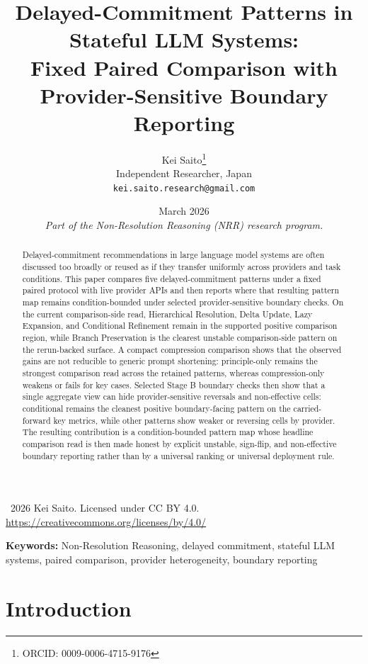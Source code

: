 \documentclass[11pt,a4paper]{article}
\title{\textbf{Delayed-Commitment Patterns in Stateful LLM Systems:\\Fixed Paired Comparison with Provider-Sensitive Boundary Reporting}}
\author{
  Kei Saito\thanks{ORCID: 0009-0006-4715-9176} \\
  Independent Researcher, Japan \\
  \texttt{kei.saito.research@gmail.com}
}
\date{March 2026 \\[0.5em]
\textit{Part of the Non-Resolution Reasoning (NRR) research program.}}
\begin{document}
\maketitle

\begin{center}
\textcopyright\ 2026 Kei Saito.
Licensed under CC BY 4.0.\\
\url{https://creativecommons.org/licenses/by/4.0/}
\end{center}

\begin{abstract}
Delayed-commitment recommendations in large language model systems are often discussed too broadly or reused as if they transfer uniformly across providers and task conditions. This paper compares five delayed-commitment patterns under a fixed paired protocol with live provider APIs and then reports where that resulting pattern map remains condition-bounded under selected provider-sensitive boundary checks. On the current comparison-side read, Hierarchical Resolution, Delta Update, Lazy Expansion, and Conditional Refinement remain in the supported positive comparison region, while Branch Preservation is the clearest unstable comparison-side pattern on the rerun-backed surface. A compact compression comparison shows that the observed gains are not reducible to generic prompt shortening: principle-only remains the strongest comparison read across the retained patterns, whereas compression-only weakens or fails for key cases. Selected Stage B boundary checks then show that a single aggregate view can hide provider-sensitive reversals and non-effective cells: conditional remains the cleanest positive boundary-facing pattern on the carried-forward key metrics, while other patterns show weaker or reversing cells by provider. The resulting contribution is a condition-bounded pattern map whose headline comparison read is then made honest by explicit unstable, sign-flip, and non-effective boundary reporting rather than by a universal ranking or universal deployment rule.

\end{abstract}

\noindent\textbf{Keywords:} Non-Resolution Reasoning, delayed commitment, stateful LLM systems, paired comparison, provider heterogeneity, boundary reporting

\section{Introduction}
\label{sec:intro}
\end{document}
